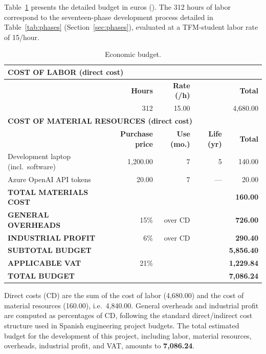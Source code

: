 \documentclass[12pt,a4paper]{report}
\begin{document}
Table~\ref{tab:budget} presents the detailed budget in euros (\texteuro{}). The 312 hours
of labor correspond to the seventeen-phase development process detailed in
Table~\ref{tab:phases} (Section~\ref{sec:phases}), evaluated at a TFM-student labor rate of
\texteuro{}15/hour.

\begin{table}[!ht]
\centering
\caption{Economic budget.}
\label{tab:budget}
\begin{tabularx}{\textwidth}{Xrrrr}
\toprule
\multicolumn{5}{l}{\cellcolor{tblHeadBg}\color{white}\bfseries COST OF LABOR (direct cost)} \\
\midrule
 & \textbf{Hours} & \textbf{Rate (\texteuro{}/h)} & & \textbf{Total} \\
 & 312 & 15.00 & & 4{,}680.00 \texteuro{} \\
\midrule
\multicolumn{5}{l}{\cellcolor{tblHeadBg}\color{white}\bfseries COST OF MATERIAL RESOURCES (direct cost)} \\
\midrule
 & \textbf{Purchase price} & \textbf{Use (mo.)} & \textbf{Life (yr)} & \textbf{Total} \\
Development laptop (incl.\ software) & 1{,}200.00 \texteuro{} & 7 & 5 & 140.00 \texteuro{} \\
Azure OpenAI API tokens & 20.00 \texteuro{} & 7 & --- & 20.00 \texteuro{} \\
\midrule
\textbf{TOTAL MATERIALS COST} & & & & \textbf{160.00 \texteuro{}} \\
\midrule
\textbf{GENERAL OVERHEADS} & 15\% & over CD & & \textbf{726.00 \texteuro{}} \\
\textbf{INDUSTRIAL PROFIT} & 6\% & over CD & & \textbf{290.40 \texteuro{}} \\
\midrule
\textbf{SUBTOTAL BUDGET} & & & & \textbf{5{,}856.40 \texteuro{}} \\
\textbf{APPLICABLE VAT} & 21\% & & & \textbf{1{,}229.84 \texteuro{}} \\
\midrule
\textbf{TOTAL BUDGET} & & & & \textbf{7{,}086.24 \texteuro{}} \\
\bottomrule
\end{tabularx}
\end{table}

Direct costs (CD) are the sum of the cost of labor (\texteuro{}4,680.00) and the cost of
material resources (\texteuro{}160.00), i.e.\ \texteuro{}4,840.00. General overheads and
industrial profit are computed as percentages of CD, following the standard direct/indirect
cost structure used in Spanish engineering project budgets. The total estimated budget for
the development of this project, including labor, material resources, overheads, industrial
profit, and VAT, amounts to \textbf{\texteuro{}7,086.24}.
\end{document}

